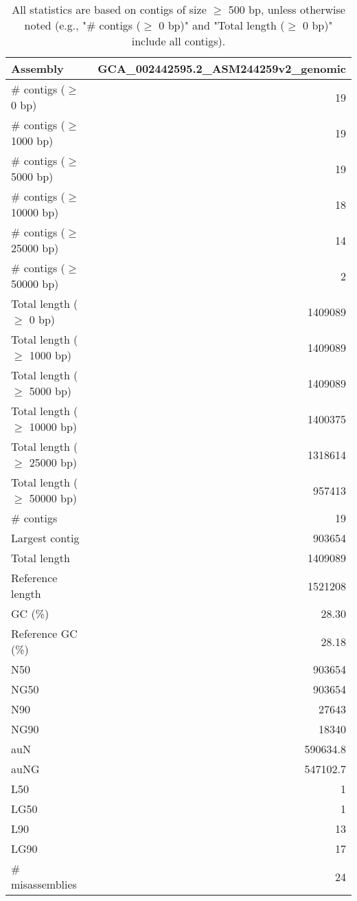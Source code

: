 \documentclass[12pt,a4paper]{article}
\begin{document}
\begin{table}[ht]
\begin{center}
\caption{All statistics are based on contigs of size $\geq$ 500 bp, unless otherwise noted (e.g., "\# contigs ($\geq$ 0 bp)" and "Total length ($\geq$ 0 bp)" include all contigs).}
\begin{tabular}{|l*{1}{|r}|}
\hline
Assembly & GCA\_002442595.2\_ASM244259v2\_genomic \\ \hline
\# contigs ($\geq$ 0 bp) & 19 \\ \hline
\# contigs ($\geq$ 1000 bp) & 19 \\ \hline
\# contigs ($\geq$ 5000 bp) & 19 \\ \hline
\# contigs ($\geq$ 10000 bp) & 18 \\ \hline
\# contigs ($\geq$ 25000 bp) & 14 \\ \hline
\# contigs ($\geq$ 50000 bp) & 2 \\ \hline
Total length ($\geq$ 0 bp) & 1409089 \\ \hline
Total length ($\geq$ 1000 bp) & 1409089 \\ \hline
Total length ($\geq$ 5000 bp) & 1409089 \\ \hline
Total length ($\geq$ 10000 bp) & 1400375 \\ \hline
Total length ($\geq$ 25000 bp) & 1318614 \\ \hline
Total length ($\geq$ 50000 bp) & 957413 \\ \hline
\# contigs & 19 \\ \hline
Largest contig & 903654 \\ \hline
Total length & 1409089 \\ \hline
Reference length & 1521208 \\ \hline
GC (\%) & 28.30 \\ \hline
Reference GC (\%) & 28.18 \\ \hline
N50 & 903654 \\ \hline
NG50 & 903654 \\ \hline
N90 & 27643 \\ \hline
NG90 & 18340 \\ \hline
auN & 590634.8 \\ \hline
auNG & 547102.7 \\ \hline
L50 & 1 \\ \hline
LG50 & 1 \\ \hline
L90 & 13 \\ \hline
LG90 & 17 \\ \hline
\# misassemblies & 24 \\ \hline

\end{tabular}
\end{center}
\end{table}
\end{document}
